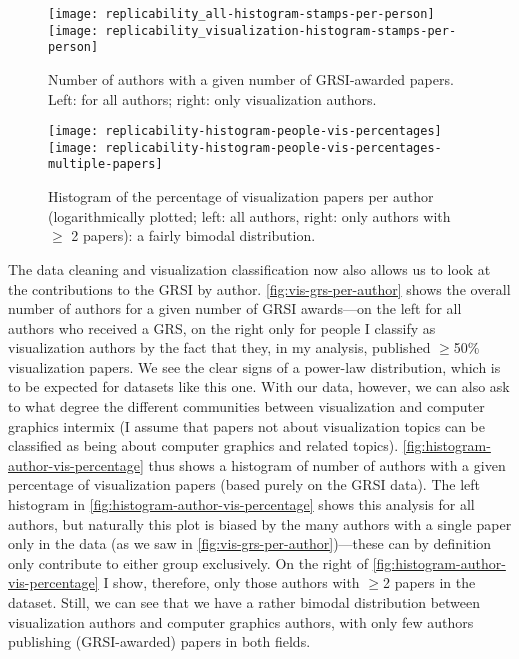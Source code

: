 \documentclass[conference]{vgtc}                     %
\begin{document}
\begin{figure}
	\centering
	\texttt{[image: replicability\_all-histogram-stamps-per-person]}\hfill%
	\texttt{[image: replicability\_visualization-histogram-stamps-per-person]}%
	\caption{Number of authors with a given number of GRSI-awarded papers. Left: for all authors; right: only visualization authors.}
	\label{fig:vis-grs-per-author}
\end{figure}

\begin{figure}
	\centering
	\texttt{[image: replicability-histogram-people-vis-percentages]}\hfill%
	\texttt{[image: replicability-histogram-people-vis-percentages-multiple-papers]}%
	\caption{Histogram of the percentage of visualization papers per author (logarithmically plotted; left: all authors, right: only authors with $\geq$ 2 papers): a fairly bimodal distribution.}
	\label{fig:histogram-author-vis-percentage}
\end{figure}

The data cleaning and visualization classification now also allows us to look at the contributions to the GRSI by author. \autoref{fig:vis-grs-per-author} shows the overall number of authors for a given number of GRSI awards---on the left for all authors who received a GRS, on the right only for people I classify as visualization authors by the fact that they, in my analysis, published $\geq$50\% visualization papers. We see the clear signs of a power-law distribution, which is to be expected for datasets like this one. With our data, however, we can also ask to what degree the different communities between visualization and computer graphics intermix (I assume that papers not about visualization topics can be classified as being about computer graphics and related topics). \autoref{fig:histogram-author-vis-percentage} thus shows a histogram of number of authors with a given percentage of visualization papers (based purely on the GRSI data). The left histogram in \autoref{fig:histogram-author-vis-percentage} shows this analysis for all authors, but naturally this plot is biased by the many authors with a single paper only in the data (as we saw in \autoref{fig:vis-grs-per-author})---these can by definition only contribute to either group exclusively. On the right of \autoref{fig:histogram-author-vis-percentage} I show, therefore, only those authors with $\geq$2 papers in the dataset. Still, we can see that we have a rather bimodal distribution between visualization authors and computer graphics authors, with only few authors publishing (GRSI-awarded) papers in both fields.
\end{document}
